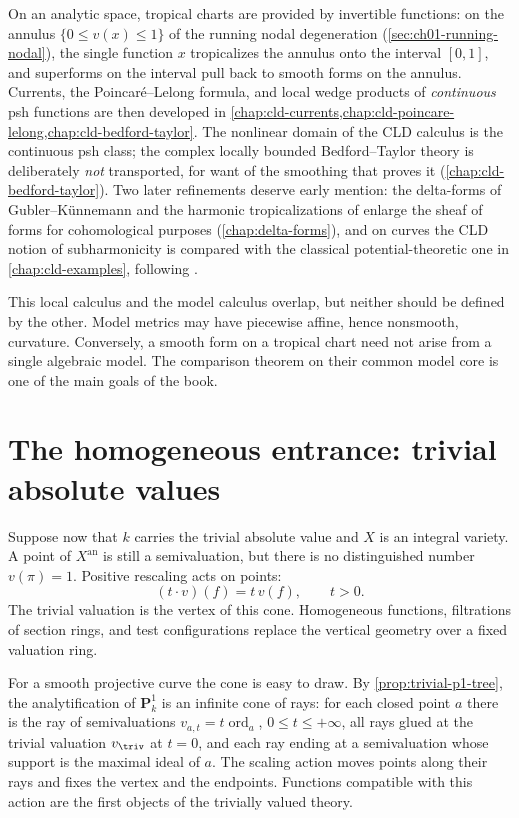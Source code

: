 On an analytic space, tropical charts are provided by invertible functions:
on the annulus $\{0\leq v(x)\leq1\}$ of the running nodal degeneration
(\cref{sec:ch01-running-nodal}), the single function $x$ tropicalizes the
annulus onto the interval $[0,1]$, and superforms on the interval pull back
to smooth forms on the annulus.  Currents, the Poincar\'e--Lelong formula,
and local wedge products of \emph{continuous} psh functions are then developed
in \cref{chap:cld-currents,chap:cld-poincare-lelong,chap:cld-bedford-taylor}.
The nonlinear domain of the CLD calculus is the continuous psh class; the
complex locally bounded Bedford--Taylor theory is deliberately \emph{not}
transported, for want of the smoothing that proves it
(\cref{chap:cld-bedford-taylor}).
Two later refinements deserve early mention: the delta-forms of
Gubler--K\"unnemann \cite{GK17,GK19} and the harmonic tropicalizations of
\cite{GJR26} enlarge the sheaf of forms for cohomological purposes
(\cref{chap:delta-forms}), and on curves the CLD notion of subharmonicity is
compared with the classical potential-theoretic one in
\cref{chap:cld-examples}, following \cite{Wanner19,GR25PL,GR25Classical}.

This local calculus and the model calculus overlap, but neither should be
defined by the other.  Model metrics may have piecewise affine, hence
nonsmooth, curvature.  Conversely, a smooth form on a tropical chart need
not arise from a single algebraic model.  The comparison theorem on their
common model core is one of the main goals of the book.

\section{The homogeneous entrance: trivial absolute values}
\label{sec:ch01-homogeneous-entrance}

Suppose now that $k$ carries the trivial absolute value and $X$ is an
integral variety.  A point of
$X^{\mathrm{an}}$ is still a semivaluation, but there is no distinguished
number $v(\pi)=1$.  Positive rescaling acts on points:
\[
                         (t\cdot v)(f)=t\,v(f),\qquad t>0.
\]
The trivial valuation is the vertex of this cone.  Homogeneous functions,
filtrations of section rings, and test configurations replace the vertical
geometry over a fixed valuation ring.

For a smooth projective curve the cone is easy to draw.  By
\cref{prop:trivial-p1-tree}, the analytification of $\mathbf P^1_k$ is an
infinite cone of rays: for each closed point $a$ there is the ray of
semivaluations $v_{a,t}=t\operatorname{ord}_a$, $0\leq t\leq+\infty$, all
rays glued at the trivial valuation $v_{\triv}$ at $t=0$, and each ray
ending at a semivaluation whose support is the maximal ideal of $a$.  The
scaling action moves points along their rays and fixes the vertex and the
endpoints.  Functions compatible with this action are the first objects of
the trivially valued theory.

